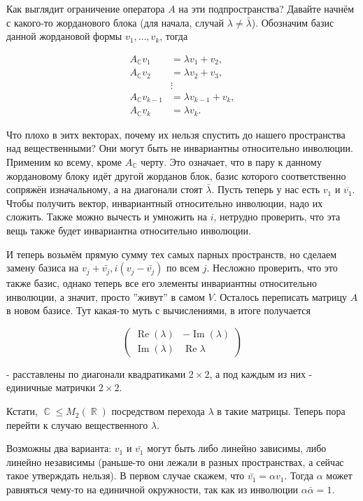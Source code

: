 \documentclass[a4paper,100pt]{article}
\theoremstyle{indented}
\theoremstyle{definition}
\theoremstyle{remark}
\DeclareMathOperator{\Imf}{Im}
\DeclareMathOperator{\CC}{\mathbb{C}}
\DeclareMathOperator{\RR}{\mathbb{R}}
\DeclareMathOperator{\Real}{Re}
\begin{document}
Как выглядит ограничение оператора $A$ на эти подпространства? Давайте начнём с какого-то жорданового блока (для начала, случай $\lambda\neq \bar{\lambda}$). Обозначим базис данной жордановой формы $v_1, \ldots, v_k$, тогда 

\begin{align*}
    A_{\CC}v_1&=\lambda v_1+v_2, \\
    A_{\CC}v_2&=\lambda v_2+v_3, \\
    &\vdots \\
    A_{\CC}v_{k-1}&=\lambda v_{k-1}+v_k, \\
    A_{\CC}v_k&=\lambda v_k.
\end{align*}

Что плохо в эитх векторах, почему их нельзя спустить до нашего пространства над вещественными? Они могут быть не инвариантны относительно инволюции. Применим ко всему, кроме $A_{\CC}$ черту. Это означает, что в пару к данному жордановому блоку идёт другой жорданов блок, базис которого соответственно сопряжён изначальному, а на диагонали стоят $\bar{\lambda}$. Пусть теперь у нас есть $v_1$ и $\overline{v_1}$. Чтобы получить вектор, инвариантный относительно инволюции, надо их сложить. Также можно вычесть и умножить на $i$, нетрудно проверить, что эта вещь также будет инвариантна относительно инволюции. \ 

И теперь возьмём прямую сумму тех самых парных пространств, но сделаем замену базиса на $v_j+\bar{v_j}, i(v_j-\bar{v_j})$ по всем $j$. Несложно проверить, что это также базис, однако теперь все его элементы инвариантны относительно инволюции, а значит, просто ''живут'' в самом $V$. Осталось переписать матрицу $A$ в новом базисе. Тут какая-то муть с вычислениями, в итоге получается

\begin{equation*}
    \begin{pmatrix}
        \Real(\lambda) & -\Imf(\lambda) \\
        \Imf(\lambda) & \Real{\lambda}
    \end{pmatrix}
\end{equation*}

- расставлены по диагонали квадратиками $2\times 2$, а под каждым из них - единичные матрички $2\times2$. \ 

Кстати, $\CC\leq M_2(\RR)$ посредством перехода $\lambda$ в такие матрицы. Теперь пора перейти к случаю вещественного $\lambda$. \ 

Возможны два варианта: $v_1$ и $\bar{v_1}$ могут быть либо линейно зависимы, либо линейно независимы (раньше-то они лежали в разных пространствах, а сейчас такое утверждать нельзя). В первом случае скажем, что $\bar{v_1}=\alpha v_1$. Тогда $\alpha$ может равняться чему-то на единичной окружности, так как из инволюции $\alpha \bar{\alpha}=1$. \\
\end{document}
